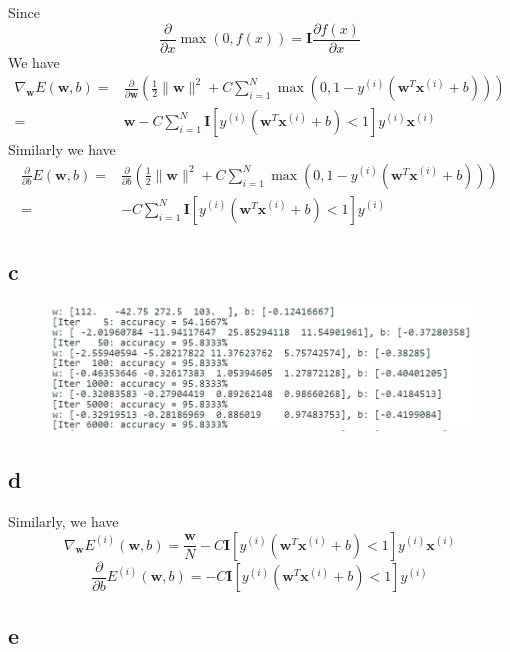 \documentclass{article}
\begin{document}
Since 
$$\frac{\partial}{\partial x} \max(0, f(x))= \mathbf{I} \frac{\partial f(x)}{\partial x}$$
We have
$$
\begin{aligned}
\nabla_{\mathbf{w}} E(\mathbf{w}, b) = & \frac{\partial}{\partial \mathbf{w}} (\frac{1}{2}\|\mathbf{w}\|^{2}+C \sum_{i=1}^{N} \max (0,1-y^{(i)}(\mathbf{w}^{T} \mathbf{x}^{(i)}+b))) \\
= & \mathbf{w}-C \sum_{i=1}^{N} \mathbf{I}[y^{(i)}(\mathbf{w}^{T} \mathbf{x}^{(i)}+b)<1] y^{(i)} \mathbf{x}^{(i)}
\end{aligned}
$$
Similarly we have
$$
\begin{aligned}
\frac{\partial}{\partial b} E(\mathbf{w}, b) = & \frac{\partial}{\partial b} (\frac{1}{2}\|\mathbf{w}\|^{2}+C \sum_{i=1}^{N} \max (0,1-y^{(i)}(\mathbf{w}^{T} \mathbf{x}^{(i)}+b))) \\
= & -C \sum_{i=1}^{N} \mathbf{I}[y^{(i)}(\mathbf{w}^{T} \mathbf{x}^{(i)}+b)<1] y^{(i)}
\end{aligned}
$$

\newpage

\subsection*{c}

\begin{figure}[htbp]
    \centering
    \includegraphics[width=.75\textwidth]{q4c.png}
\end{figure}

\subsection*{d}

Similarly, we have
$$\nabla_{\mathbf{w}} E^{(i)}(\mathbf{w}, b) = \frac{\mathbf{w}}{N} - C \mathbf{I}[y^{(i)}(\mathbf{w}^{T} \mathbf{x}^{(i)}+b)<1] y^{(i)} \mathbf{x}^{(i)}$$
$$\frac{\partial}{\partial b} E^{(i)}(\mathbf{w}, b) = - C \mathbf{I}[y^{(i)}(\mathbf{w}^{T} \mathbf{x}^{(i)}+b)<1] y^{(i)}$$

\subsection*{e}
\end{document}
